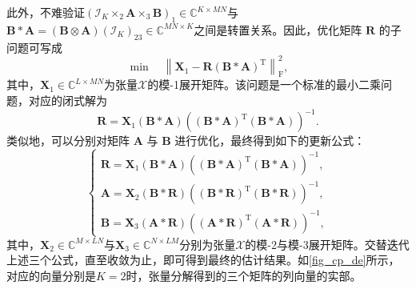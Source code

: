 此外，不难验证\( (\mathcal{I}_K \times_2 \mathbf{A} \times_3 \mathbf{B})_1 \in \mathbb{C}^{K \times M N} \)与\( \mathbf{B} \ast  \mathbf{A} = (\mathbf{B} \otimes \mathbf{A}) (\mathcal{I}_K)_{23} \in \mathbb{C}^{M N \times K} \)之间是转置关系。因此，优化矩阵 \( \mathbf{R} \) 的子问题可写成   
\[
    \min \quad \left\| \mathbf{X}_{1} - \mathbf{R} (\mathbf{B} \ast  \mathbf{A})^{\mathrm{T}} \right\|_{\mathrm{F}}^2,
\]
其中，\( \mathbf{X}_{1} \in \mathbb{C}^{L \times M N} \)为张量\( \mathcal{X} \)的模-1展开矩阵。该问题是一个标准的最小二乘问题，对应的闭式解为
\[
    \mathbf{R} = \mathbf{X}_{1} (\mathbf{B} \ast  \mathbf{A}) \left( (\mathbf{B} \ast  \mathbf{A})^{\mathrm{T}} (\mathbf{B} \ast  \mathbf{A}) \right)^{-1}.
\]
类似地，可以分别对矩阵 \( \mathbf{A} \) 与 \( \mathbf{B} \) 进行优化，最终得到如下的更新公式：
\[
    \begin{cases}
        \mathbf{R} = \mathbf{X}_{1} (\mathbf{B} \ast  \mathbf{A}) \left( (\mathbf{B} \ast  \mathbf{A})^{\mathrm{T}} (\mathbf{B} \ast  \mathbf{A}) \right)^{-1}, \\
        \mathbf{A} = \mathbf{X}_{2} (\mathbf{B} \ast \mathbf{R}) \left( (\mathbf{B} \ast \mathbf{R})^{\mathrm{T}} (\mathbf{B} \ast  \mathbf{R}) \right)^{-1}, \\
        \mathbf{B} = \mathbf{X}_{3} (\mathbf{A} \ast  \mathbf{R}) \left( (\mathbf{A} \ast  \mathbf{R})^{\mathrm{T}} (\mathbf{A} \ast  \mathbf{R}) \right)^{-1},
    \end{cases}
\]
其中，\( \mathbf{X}_{2} \in \mathbb{C}^{M \times L N} \)与\( \mathbf{X}_{3} \in \mathbb{C}^{N \times L M} \)分别为张量\( \mathcal{X} \)的模-2与模-3展开矩阵。交替迭代上述三个公式，直至收敛为止，即可得到最终的估计结果。如\cref{fig_cp_de}所示，对应的向量分别是\( K=2 \)时，张量分解得到的三个矩阵的列向量的实部。
